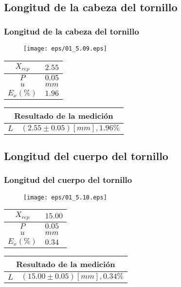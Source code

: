 \documentclass[letter,11pt]{beamer}
\begin{document}
\subsection{Longitud de la cabeza del tornillo}
\begin{frame}
\frametitle{Longitud de la cabeza del tornillo}
\vspace*{0.8cm}
\begin{figure}
\centering
\texttt{[image: eps/01\_5.09.eps]}
\end{figure}
\vspace*{0.4cm}
\scriptsize
\begin{tabular}{|c|>{\centering}m{1.8cm}<{\centering}|}
\hline
$X_{rep}$ &   $2.55$ \tabularnewline \hline
      $P$ &   $0.05$ \tabularnewline \hline
      $u$ &     $mm$ \tabularnewline \hline
$E_x(\%)$ &   $1.96$ \tabularnewline \hline
\end{tabular}
\quad
\begin{tabular}{|c|>{\centering}m{5.7cm}<{\centering}|}
\hline
\multicolumn{2}{|c|}{\textbf{Resultado de la medición}} \\ \hline
$L$ & $( 2.55\pm0.05)[mm], 1.96\%$ \tabularnewline \hline
\end{tabular}
\end{frame}

\subsection{Longitud del cuerpo del tornillo}
\begin{frame}
\frametitle{Longitud del cuerpo del tornillo}
\vspace*{0.8cm}
\begin{figure}
\centering
\texttt{[image: eps/01\_5.10.eps]}
\end{figure}
\vspace*{0.4cm}
\scriptsize
\begin{tabular}{|c|>{\centering}m{1.8cm}<{\centering}|}
\hline
$X_{rep}$ &  $15.00$ \tabularnewline \hline
      $P$ &   $0.05$ \tabularnewline \hline
      $u$ &     $mm$ \tabularnewline \hline
$E_x(\%)$ &   $0.34$ \tabularnewline \hline
\end{tabular}
\quad
\begin{tabular}{|c|>{\centering}m{5.7cm}<{\centering}|}
\hline
\multicolumn{2}{|c|}{\textbf{Resultado de la medición}} \\ \hline
$L$ & $( 15.00\pm0.05)[mm], 0.34\%$ \tabularnewline \hline
\end{tabular}
\end{frame}
\end{document}
